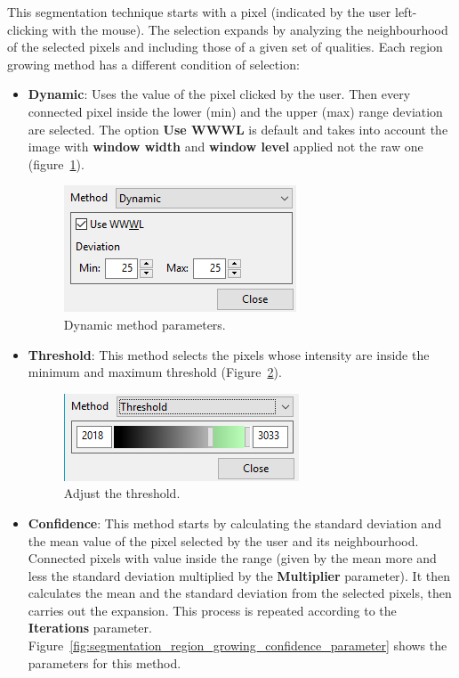 This segmentation technique starts with a pixel (indicated by the user left-clicking with the mouse). The selection expands by analyzing the neighbourhood of the selected pixels and including those of a given set of qualities. Each region growing method has a different condition of selection:

\begin{itemize}
	\item \textbf{Dynamic}: Uses the value of the pixel clicked by the user. Then every connected pixel inside the lower (min) and the upper (max) range deviation are selected. The option \textbf{Use WWWL} is default and takes into account the image with \textbf{window width} and \textbf{window level} applied not the raw one (figure~\ref{fig:segmentation_region_growing_dinamic_parameter}).

	\begin{figure}[!htb]
	\centering
	\includegraphics[scale=0.7]{../user_guide_figures/invesalius_screen/segmentation_region_growing_dinamic_parameter_en.png}
	\caption{Dynamic method parameters.}
	\label{fig:segmentation_region_growing_dinamic_parameter}
	\end{figure}

	\item \textbf{Threshold}: This method selects the pixels whose intensity are inside the minimum and maximum threshold (Figure~\ref{fig:segmentation_region_growing_limiar}).

	\begin{figure}[!htb]
	\centering
	\includegraphics[scale=0.7]{../user_guide_figures/invesalius_screen/segmentation_region_growing_limiar_en.png}
    \caption{Adjust the threshold.}
	\label{fig:segmentation_region_growing_limiar}
	\end{figure}

    \item \textbf{Confidence}: This method starts by calculating the standard deviation and the mean value of the pixel selected by the user and its neighbourhood. Connected pixels with value inside the range (given by the mean more and less the standard deviation multiplied by the \textbf{Multiplier} parameter). It then calculates the mean and the standard deviation from the selected pixels, then carries out the expansion.  This process is repeated according to the \textbf{Iterations} parameter. Figure~\ref{fig:segmentation_region_growing_confidence_parameter} shows the parameters for this method.


\end{itemize}
